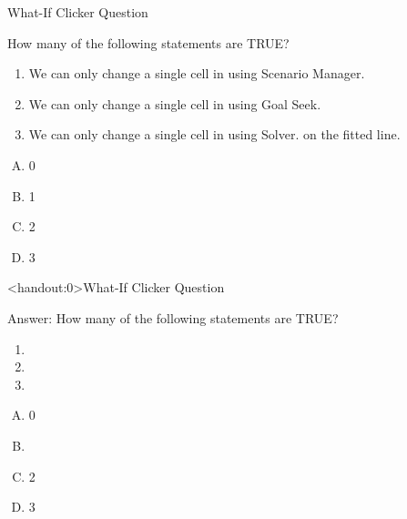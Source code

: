 \documentclass[xcolor=svgnames, handout]{beamer}
\begin{document}
\begin{frame}{What-If Clicker Question}
  \begin{example}
 How many of the following statements are TRUE?
 \begin{enumerate}
\item We can only change a single cell in using Scenario Manager.
\item We can only change a single cell in using Goal Seek.
\item We can only change a single cell in using Solver.
on the fitted line.
 \end{enumerate}
\begin{multicols}{4}
\begin{enumerate}[A)]
\item 0 
\item 1
\item 2
\item 3
\end{enumerate}
\end{multicols}
  \end{example} 
\end{frame}

\begin{frame}<handout:0>{What-If Clicker Question}
  \begin{block}{Answer:}
 How many of the following statements are TRUE?
 \begin{enumerate}
\item {}
\item {}
\item {}
 \end{enumerate}
\begin{multicols}{5}
\begin{enumerate}[A)]
\item 0 
\item \textbf<4>{\textit<4>{{}}}
\item 2
\item 3
\end{enumerate}
\end{multicols}
  \end{block} 
\end{frame}
\end{document}
